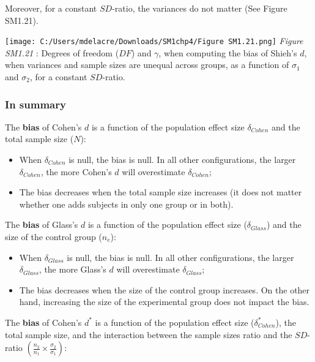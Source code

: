 \documentclass[
  english,
  man,mask,floatsintext]{apa6}
\providecommand{\tightlist}{%
  \setlength{\itemsep}{0pt}\setlength{\parskip}{0pt}}
\begin{document}
Moreover, for a constant \(SD\)-ratio, the variances do not matter (See Figure SM1.21).

\texttt{[image: C:/Users/mdelacre/Downloads/SM1chp4/Figure SM1.21.png]}
\emph{Figure SM1.21} : Degrees of freedom (\(DF\)) and \(\gamma\), when computing the bias of Shieh's \(d\), when variances and sample sizes are unequal across groups, as a function of \(\sigma_1\) and \(\sigma_2\), for a constant \(SD\)-ratio.

\hypertarget{in-summary}{%
\subsubsection{In summary}\label{in-summary}}

The \textbf{bias} of Cohen's \(d\) is a function of the population effect size \(\delta_{Cohen}\) and the total sample size (\(N\)):

\begin{itemize}
\tightlist
\item
  When \(\delta_{Cohen}\) is null, the bias is null. In all other configurations, the larger \(\delta_{Cohen}\), the more Cohen's \(d\) will overestimate \(\delta_{Cohen}\);\\
\item
  The bias decreases when the total sample size increases (it does not matter whether one adds subjects in only one group or in both).
\end{itemize}

The \textbf{bias} of Glass's \(d\) is a function of the population effect size (\(\delta_{Glass}\)) and the size of the control group (\(n_e\)):

\begin{itemize}
\tightlist
\item
  When \(\delta_{Glass}\) is null, the bias is null. In all other configurations, the larger \(\delta_{Glass}\), the more Glass's \(d\) will overestimate \(\delta_{Glass}\);\\
\item
  The bias decreases when the size of the control group increases. On the other hand, increasing the size of the experimental group does not impact the bias.
\end{itemize}

The \textbf{bias} of Cohen's \(d^*\) is a function of the population effect size (\(\delta^*_{Cohen}\)), the total sample size, and the interaction between the sample sizes ratio and the \(SD\)-ratio \(\left(\frac{n_2}{n_1}\times\frac{\sigma_2}{\sigma_1} \right)\):
\end{document}
